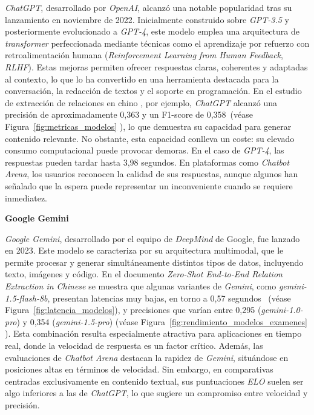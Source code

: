 \textit{ChatGPT}, desarrollado por \textit{OpenAI}, alcanzó una notable popularidad tras su lanzamiento en noviembre de 2022. Inicialmente construido sobre \textit{GPT-3.5} y posteriormente evolucionado a \textit{GPT-4}, este modelo emplea una arquitectura de \textit{transformer} perfeccionada mediante técnicas como el aprendizaje por refuerzo con retroalimentación humana (\textit{Reinforcement Learning from Human Feedback}, \textit{RLHF}). Estas mejoras permiten ofrecer respuestas claras, coherentes y adaptadas al contexto, lo que lo ha convertido en una herramienta destacada para la conversación, la redacción de textos y el soporte en programación.
En el estudio de extracción de relaciones en chino \cite{ref41}, por ejemplo, \textit{ChatGPT} alcanzó una precisión de aproximadamente 0,363 y un F1-score de 0,358~(véase Figura~\ref{fig:metricas_modelos} \cite{ref41}), lo que demuestra su capacidad para generar contenido relevante. No obstante, esta capacidad conlleva un coste: su elevado consumo computacional puede provocar demoras. En el caso de \textit{GPT-4}, las respuestas pueden tardar hasta 3,98 segundos. En plataformas como \textit{Chatbot Arena}, los usuarios reconocen la calidad de sus respuestas, aunque algunos han señalado que la espera puede representar un inconveniente cuando se requiere inmediatez.

\vspace{0.4cm}
\noindent\textbf{Google Gemini}

\textit{Google Gemini}, desarrollado por el equipo de \textit{DeepMind} \cite{ref72} de Google, fue lanzado en 2023. Este modelo se caracteriza por su arquitectura multimodal, que le permite procesar y generar simultáneamente distintos tipos de datos, incluyendo texto, imágenes y código. En el documento \textit{Zero-Shot End-to-End Relation Extraction in Chinese} \cite{ref41} se muestra que algunas variantes de \textit{Gemini}, como \textit{gemini-1.5-flash-8b}, presentan latencias muy bajas, en torno a 0,57 segundos ~(véase Figura~\ref{fig:latencia_modelos}), y precisiones que varían entre 0,295 (\textit{gemini-1.0-pro}) y 0,354 (\textit{gemini-1.5-pro}) (véase Figura~\ref{fig:rendimiento_modelos_examenes} \cite{ref41} ). Esta combinación resulta especialmente atractiva para aplicaciones en tiempo real, donde la velocidad de respuesta es un factor crítico.
Además, las evaluaciones de \textit{Chatbot Arena} destacan la rapidez de \textit{Gemini}, situándose en posiciones altas en términos de velocidad. Sin embargo, en comparativas centradas exclusivamente en contenido textual, sus puntuaciones \textit{ELO} suelen ser algo inferiores a las de \textit{ChatGPT}, lo que sugiere un compromiso entre velocidad y precisión.

